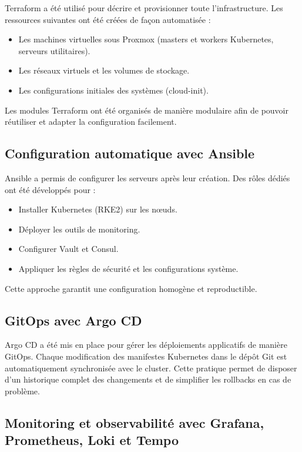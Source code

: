 Terraform a été utilisé pour décrire et provisionner toute l'infrastructure. Les ressources suivantes ont été créées de façon automatisée :

\begin{itemize}
  \item Les machines virtuelles sous Proxmox (masters et workers Kubernetes, serveurs utilitaires).
  \item Les réseaux virtuels et les volumes de stockage.
  \item Les configurations initiales des systèmes (cloud-init).
\end{itemize}

Les modules Terraform ont été organisés de manière modulaire afin de pouvoir réutiliser et adapter la configuration facilement.

\subsection{Configuration automatique avec Ansible}

Ansible a permis de configurer les serveurs après leur création. Des rôles dédiés ont été développés pour :

\begin{itemize}
  \item Installer Kubernetes (RKE2) sur les nœuds.
  \item Déployer les outils de monitoring.
  \item Configurer Vault et Consul.
  \item Appliquer les règles de sécurité et les configurations système.
\end{itemize}

Cette approche garantit une configuration homogène et reproductible.

\subsection{GitOps avec Argo CD}

Argo CD a été mis en place pour gérer les déploiements applicatifs de manière GitOps. Chaque modification des manifestes Kubernetes dans le dépôt Git est automatiquement synchronisée avec le cluster. Cette pratique permet de disposer d’un historique complet des changements et de simplifier les rollbacks en cas de problème.

\subsection{Monitoring et observabilité avec Grafana, Prometheus, Loki et Tempo}

